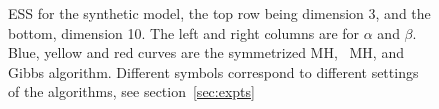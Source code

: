 \begin{figure}[H]
\begin{minipage}[hp]{0.24\linewidth}
	\end{minipage}
    \caption{ESS for the synthetic model, the top row being dimension 3, and the bottom, dimension 10. The left and right columns are for $\alpha$ and $\beta$. Blue, yellow and red curves are the symmetrized MH, \naive\ MH, and Gibbs algorithm. Different symbols correspond to different settings of the algorithms, see section~\ref{sec:expts}}
     \label{fig:ESS_EXP_notpersec}
  \end{figure}



